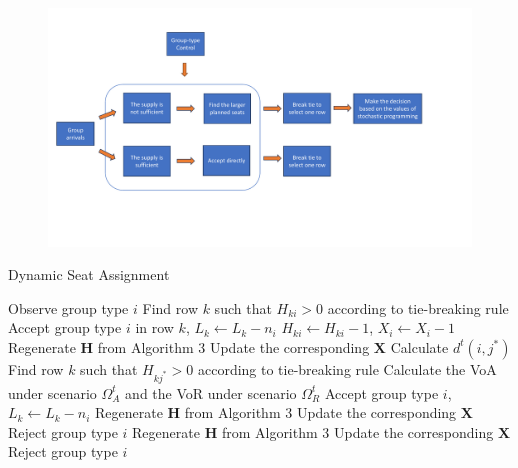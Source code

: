 \begin{figure}[ht]
  \centering
    \includegraphics[width=1\textwidth]{./Figures/test.pdf}
\end{figure}


\begin{algorithm}[H]
  \caption{Dynamic Seat Assignment}\label{algo_dynamic_policy}
  { Observe group type $i$\;
    {Find row $k$ such that $H_{ki} >0$ according to tie-breaking rule\; Accept group type $i$ in row $k$, $L_{k} \gets L_{k} -n_{i}$\; $H_{ki} \gets H_{ki} -1$, $X_{i} \gets X_{i} -1$
    {Regenerate $\bm{H}$ from Algorithm 3\; Update the corresponding $\bm{X}$}
    }
    {Calculate $d^{t}(i, j^{*})$\;
    {Find row $k$ such that $H_{kj^{*}} > 0$ according to tie-breaking rule\; 
    Calculate the VoA under scenario $\Omega^{t}_{A}$ and the VoR under scenario $\Omega^{t}_{R}$\;
    {Accept group type $i$, $L_{k} \gets L_{k} - n_{i}$\; Regenerate $\bm{H}$ from Algorithm 3\; Update the corresponding $\bm{X}$\;}
    {Reject group type $i$\; Regenerate $\bm{H}$ from Algorithm 3\; Update the corresponding $\bm{X}$\;}}
    {Reject group type $i$\;}
    }}
\end{algorithm}






